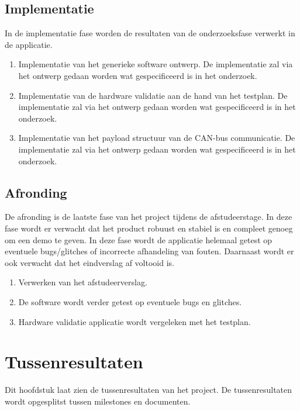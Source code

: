 \subsection{Implementatie}
In de implementatie fase worden de resultaten van de onderzoeksfase verwerkt in de applicatie. 
\begin{enumerate}
	\item Implementatie van het generieke software ontwerp. De implementatie zal via het ontwerp gedaan worden wat gespecificeerd is in het onderzoek.
	\item Implementatie van de hardware validatie aan de hand van het testplan. De implementatie zal via het ontwerp gedaan worden wat gespecificeerd is in het onderzoek.
	\item Implementatie van het payload structuur van de CAN-bus communicatie. De implementatie zal via het ontwerp gedaan worden wat gespecificeerd is in het onderzoek.
\end{enumerate}

\newpage
\subsection{Afronding}
De afronding is de laatste fase van het project tijdens de afstudeerstage. In deze fase wordt er verwacht dat het product robuust en stabiel is en compleet genoeg om een demo te geven. In deze fase wordt de applicatie helemaal getest op eventuele bugs/glitches of incorrecte afhandeling van fouten. Daarnaast wordt er ook verwacht dat het eindverslag af voltooid is.
\begin{enumerate}
	\item Verwerken van het afstudeerverslag.
	\item De software wordt verder getest op eventuele bugs en glitches.
	\item Hardware validatie applicatie wordt vergeleken met het testplan.
\end{enumerate}


\section{Tussenresultaten}
Dit hoofdstuk laat zien de tussenresultaten van het project. De tussenresultaten wordt opgesplitst tussen milestones en documenten.

